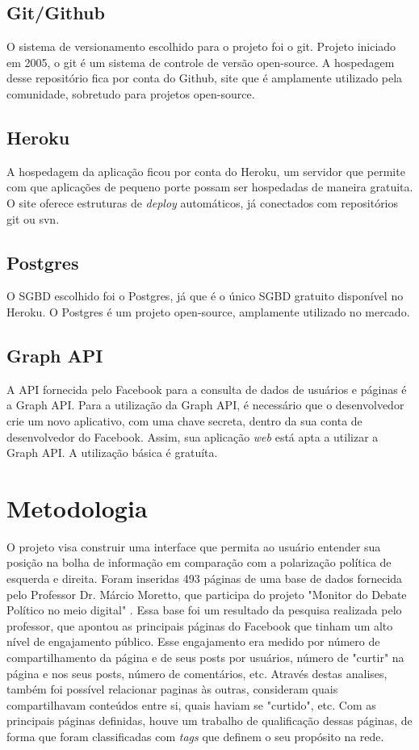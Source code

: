 \documentclass[
	12pt,				%
	oneside,			%
	a4paper,			%
	english,			%
	brazil				%
	]{abntex2ppgsi}
\begin{document}
\section{Git/Github}
O sistema de versionamento escolhido para o projeto foi o git. Projeto iniciado em 2005, o git é um sistema de controle de versão open-source. A hospedagem desse repositório fica por conta do Github, site que é amplamente utilizado pela comunidade, sobretudo para projetos open-source. 

\section{Heroku}
A hospedagem da aplicação ficou por conta do Heroku, um servidor que permite com que aplicações de pequeno porte possam ser hospedadas de maneira gratuita. O site oferece estruturas de \textit{deploy} automáticos, já conectados com repositórios git ou svn. 

\section{Postgres}
O SGBD escolhido foi o Postgres, já que é o único SGBD gratuito disponível no Heroku. O Postgres é um projeto open-source, amplamente utilizado no mercado. 

\section{Graph API}
A API fornecida pelo Facebook para a consulta de dados de usuários e páginas é a Graph API. Para a utilização da Graph API, é necessário que o desenvolvedor crie um novo aplicativo, com uma chave secreta, dentro da sua conta de desenvolvedor do Facebook. Assim, sua aplicação \textit{web} está apta a utilizar a Graph API. A utilização básica é gratuíta.

\chapter{Metodologia}
\label{metodologia}

O projeto visa construir uma interface que permita ao usuário entender sua posição na bolha de informação em comparação com a polarização política de esquerda e direita. Foram inseridas 493 páginas de uma base de dados fornecida pelo Professor Dr. Márcio Moretto, que participa do projeto "Monitor do Debate Político no meio digital" \cite{monitor}. Essa base foi um resultado da pesquisa realizada pelo professor, que apontou as principais páginas do Facebook que tinham um alto nível de engajamento público. Esse engajamento era medido por número de compartilhamento da página e de seus posts por usuários, número de "curtir" na página e nos seus posts, número de comentários, etc. Através destas analises, também foi possível relacionar paginas às outras, consideram quais compartilhavam conteúdos entre si, quais haviam se "curtido", etc. Com as principais páginas definidas, houve um trabalho de qualificação dessas páginas, de forma que foram classificadas com \textit{tags} que definem o seu propósito na rede. 
\end{document}
